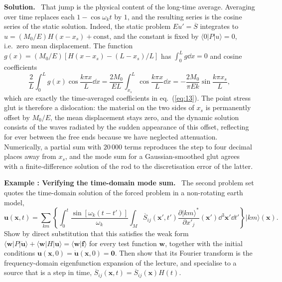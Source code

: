 \documentclass[a4paper,12pt]{paper}
\newcounter{example}
\renewenvironment{example}[1]{%
  \refstepcounter{example}%
  \begin{mdframed}[linewidth=1pt,innertopmargin=6pt,innerbottommargin=6pt]%
  \noindent\textbf{Example \theexample: #1.}\ }{%
  \end{mdframed}}
\newenvironment{solution}{\par\noindent\textbf{Solution.}\ }{\par\medskip}
\begin{document}
\begin{solution}
That jump is the physical content of the long-time average. Averaging over time replaces each
$1-\cos\omega_{k}t$ by $1$, and the resulting series is the cosine series of the static solution.
Indeed, the static problem $Eu'=\overline{S}$ integrates to $u=(M_{0}/E)H(x-x_{s})+\mathrm{const}$,
and the constant is fixed by $\langle 0|P|u\rangle=0$, i.e.\ zero mean displacement. The function
$g(x)=(M_{0}/E)[H(x-x_{s})-(L-x_{s})/L]$ has $\int_{0}^{L}g\dd x=0$ and cosine coefficients
\begin{equation}
\frac{2}{L}\int_{0}^{L}g(x)\cos\frac{k\pi x}{L}\dd x=\frac{2M_{0}}{EL}\int_{x_{s}}^{L}\cos\frac{k\pi x}{L}\dd x
=-\frac{2M_{0}}{\pi Ek}\sin\frac{k\pi x_{s}}{L},
\label{eq:17}
\end{equation}
which are exactly the time-averaged coefficients in eq.~(\ref{eq:13}). The point stress glut is
therefore a dislocation: the material on the two sides of $x_{s}$ is permanently offset by $M_{0}/E$,
the mean displacement stays zero, and the dynamic solution consists of the waves radiated by the sudden
appearance of this offset, reflecting for ever between the free ends because we have neglected attenuation.
Numerically, a partial sum with $20\,000$ terms reproduces the step to four decimal places away from
$x_{s}$, and the mode sum for a Gaussian-smoothed glut agrees with a finite-difference solution of the rod
to the discretisation error of the latter.
\end{solution}

\begin{example}{Verifying the time-domain mode sum}
The second problem set quotes the time-domain solution of the forced problem in a non-rotating earth
model,
\begin{equation}
\mathbf{u}(\mathbf{x},t)=\sum_{km}\left\{\int_{0}^{t}\frac{\sin[\omega_{k}(t-t')]}{\omega_{k}}
\int_{M}\overline{S}_{ij}(\mathbf{x}',t')\frac{\partial|km\rangle^{*}}{\partial x'_{j}}(\mathbf{x}')\dd^{3}\mathbf{x}'\dd t'\right\}|km\rangle(\mathbf{x}).
\label{eq:18}
\end{equation}
Show by direct substitution that this satisfies the weak form
$\langle\mathbf{w}|P|\ddot{\mathbf{u}}\rangle+\langle\mathbf{w}|H|\mathbf{u}\rangle=\langle\mathbf{w}|\mathbf{f}\rangle$
for every test function $\mathbf{w}$, together with the initial conditions
$\mathbf{u}(\mathbf{x},0)=\dot{\mathbf{u}}(\mathbf{x},0)=\mathbf{0}$. Then show that its Fourier transform
is the frequency-domain eigenfunction expansion of the lecture, and specialise to a source that is a step
in time, $\overline{S}_{ij}(\mathbf{x},t)=\overline{S}_{ij}(\mathbf{x})H(t)$.
\end{example}
\end{document}
